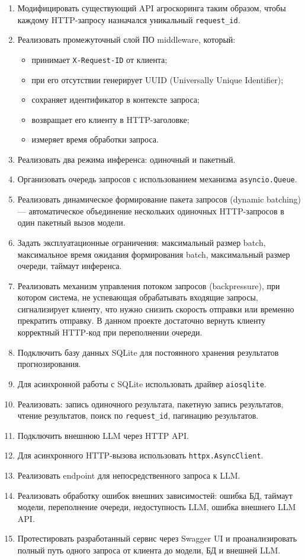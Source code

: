 \documentclass[12pt,a4paper]{article}
\begin{document}
\begin{enumerate}
    \item Модифицировать существующий API агроскоринга таким образом, чтобы каждому HTTP-запросу назначался уникальный \texttt{request\_id}.
    \item Реализовать промежуточный слой ПО middleware, который:
    \begin{itemize}
        \item принимает \texttt{X-Request-ID} от клиента;
        \item при его отсутствии генерирует UUID (Universally Unique Identifier);
        \item сохраняет идентификатор в контексте запроса;
        \item возвращает его клиенту в HTTP-заголовке;
        \item измеряет время обработки запроса.
    \end{itemize}
    \item Реализовать два режима инференса: одиночный и пакетный.
    \item Организовать очередь запросов с использованием механизма \texttt{asyncio.Queue}.
    \item Реализовать динамическое формирование пакета запросов (dynamic batching) — автоматическое объединение нескольких одиночных HTTP-запросов в один пакетный вызов модели.
    \item Задать эксплуатационные ограничения: максимальный размер batch, максимальное время ожидания формирования batch, максимальный размер очереди, таймаут инференса.
    \item Реализовать механизм управления потоком запросов (backpressure), при котором система, не успевающая обрабатывать входящие запросы, сигнализирует клиенту, что нужно снизить скорость отправки или временно прекратить отправку. В данном проекте достаточно вернуть клиенту корректный HTTP-код при переполнении очереди.
    \item Подключить базу данных SQLite для постоянного хранения результатов прогнозирования.
    \item Для асинхронной работы с SQLite использовать драйвер \texttt{aiosqlite}.
    \item Реализовать: запись одиночного результата, пакетную запись результатов, чтение результатов, поиск по \texttt{request\_id}, пагинацию результатов.
    \item Подключить внешнюю LLM через HTTP API.
    \item Для асинхронного HTTP-вызова использовать \texttt{httpx.AsyncClient}.
    \item Реализовать endpoint для непосредственного запроса к LLM.
    \item Реализовать обработку ошибок внешних зависимостей: ошибка БД, таймаут модели, переполнение очереди, недоступность LLM, ошибка внешнего LLM API.
    \item Протестировать разработанный сервис через Swagger UI и проанализировать полный путь одного запроса от клиента до модели, БД и внешней LLM.
\end{enumerate}
\end{document}
